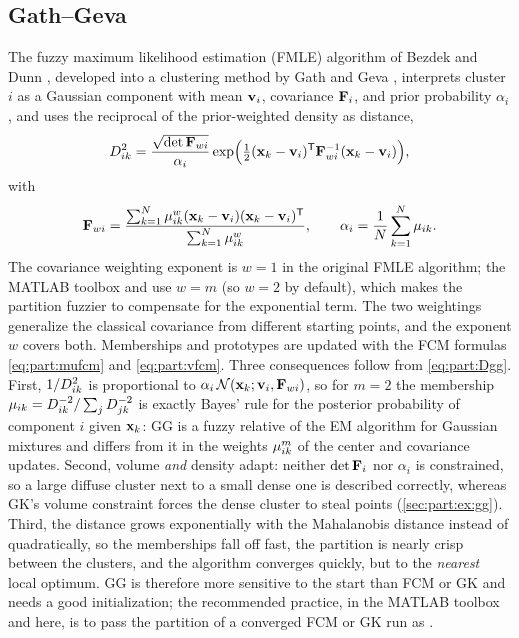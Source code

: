 \subsection{Gath--Geva}\label{sec:part:gg}

The fuzzy maximum likelihood estimation (FMLE) algorithm of Bezdek and Dunn \cite{bezdek:1975:fmle}, developed into a clustering method by Gath and Geva \cite{gath:1989}, interprets cluster $i$ as a Gaussian component with mean $\mathbf{v}_i$, covariance $\mathbf{F}_i$, and prior probability $\alpha_i$, and uses the reciprocal of the prior-weighted density as distance,
\begin{equation}
  D^2_{ik}=\frac{\sqrt{\det\mathbf{F}_{wi}}}{\alpha_i}\exp\Bigl(\tfrac12(\mathbf{x}_k-\mathbf{v}_i)^{\mathsf{T}}\mathbf{F}_{wi}^{-1}(\mathbf{x}_k-\mathbf{v}_i)\Bigr),
  \label{eq:part:Dgg}
\end{equation}
with
\begin{equation}
  \mathbf{F}_{wi}=\frac{\sum_{k=1}^{N}\mu_{ik}^{w}(\mathbf{x}_k-\mathbf{v}_i)(\mathbf{x}_k-\mathbf{v}_i)^{\mathsf{T}}}{\sum_{k=1}^{N}\mu_{ik}^{w}},\qquad
  \alpha_i=\frac1N\sum_{k=1}^{N}\mu_{ik} .
  \label{eq:part:Fgg}
\end{equation}
The covariance weighting exponent is $w=1$ in the original FMLE algorithm; the MATLAB toolbox and  use $w=m$ (so $w=2$ by default), which makes the partition fuzzier to compensate for the exponential term. The two weightings generalize the classical covariance from different starting points, and the exponent $w$ covers both. Memberships and prototypes are updated with the FCM formulas \eqref{eq:part:mufcm} and \eqref{eq:part:vfcm}. Three consequences follow from \eqref{eq:part:Dgg}. First, $1/D^2_{ik}$ is proportional to $\alpha_i\,\mathcal{N}(\mathbf{x}_k;\mathbf{v}_i,\mathbf{F}_{wi})$, so for $m=2$ the membership $\mu_{ik}=D^{-2}_{ik}/\sum_j D^{-2}_{jk}$ is exactly Bayes' rule for the posterior probability of component $i$ given $\mathbf{x}_k$: GG is a fuzzy relative of the EM algorithm for Gaussian mixtures and differs from it in the weights $\mu_{ik}^m$ of the center and covariance updates. Second, volume \emph{and} density adapt: neither $\det\mathbf{F}_i$ nor $\alpha_i$ is constrained, so a large diffuse cluster next to a small dense one is described correctly, whereas GK's volume constraint forces the dense cluster to steal points (\cref{sec:part:ex:gg}). Third, the distance grows exponentially with the Mahalanobis distance instead of quadratically, so the memberships fall off fast, the partition is nearly crisp between the clusters, and the algorithm converges quickly, but to the \emph{nearest} local optimum. GG is therefore more sensitive to the start than FCM or GK and needs a good initialization; the recommended practice, in the MATLAB toolbox and here, is to pass the partition of a converged FCM or GK run as .

